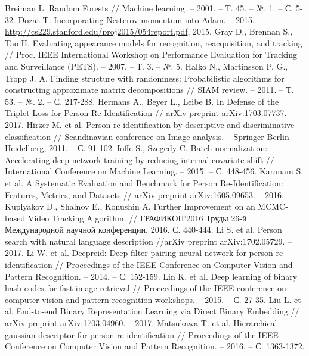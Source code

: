 \documentclass[a4paper]{article}
\begin{document}
\begin{multicols*}{2}
\begin{thebibliography}{1}
   Breiman L. Random Forests // Machine learning. -- 2001. -- Т. 45. -- №. 1. -- С. 5-32.
   Dozat T. Incorporating Nesterov momentum into Adam. -- 2015. -- \url{http://cs229.stanford.edu/proj2015/054report.pdf}, 2015.
   Gray D., Brennan S., Tao H. Evaluating appearance models for recognition, reacquisition, and tracking // Proc. IEEE International Workshop on Performance Evaluation for Tracking and Surveillance (PETS). – 2007. -- Т. 3. -- №. 5.
   Halko N., Martinsson P. G., Tropp J. A. Finding structure with randomness: Probabilistic algorithms for constructing approximate matrix decompositions // SIAM review. -- 2011. -- Т. 53. -- №. 2. -- С. 217-288.
   Hermans A., Beyer L., Leibe B. In Defense of the Triplet Loss for Person Re-Identification // arXiv preprint arXiv:1703.07737. -- 2017.
   Hirzer M. et al. Person re-identification by descriptive and discriminative classification // Scandinavian conference on Image analysis. -- Springer Berlin Heidelberg, 2011. -- С. 91-102.
   Ioffe S., Szegedy C. Batch normalization: Accelerating deep network training by reducing internal covariate shift // International Conference on Machine Learning. -- 2015. -- С. 448-456.
   Karanam S. et al. A Systematic Evaluation and Benchmark for Person Re-Identification: Features, Metrics, and Datasets // arXiv preprint arXiv:1605.09653. – 2016.
   Kuplyakov D., Shalnov E., Konushin A. Further Improvement on an MCMC-based Video Tracking Algorithm. // ГРАФИКОН'2016 Труды 26-й Международной научной конференции. 2016. С. 440-444.
   Li S. et al. Person search with natural language description //arXiv preprint arXiv:1702.05729. -- 2017.
   Li W. et al. Deepreid: Deep filter pairing neural network for person re-identification // Proceedings of the IEEE Conference on Computer Vision and Pattern Recognition. -- 2014. -- С. 152-159.
   Lin K. et al. Deep learning of binary hash codes for fast image retrieval // Proceedings of the IEEE conference on computer vision and pattern recognition workshops. -- 2015. -- С. 27-35.
   Liu L. et al. End-to-end Binary Representation Learning via Direct Binary Embedding // arXiv preprint arXiv:1703.04960. -- 2017.
   Matsukawa T. et al. Hierarchical gaussian descriptor for person re-identification // Proceedings of the IEEE Conference on Computer Vision and Pattern Recognition. – 2016. – С. 1363-1372.

\end{thebibliography}
\end{multicols*}
\end{document}
